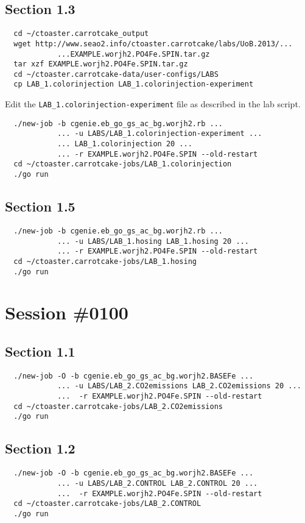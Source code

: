\documentclass[a4paper,10pt,article]{memoir}
\begin{document}
\subsection*{Section 1.3}

\begin{verbatim}
  cd ~/ctoaster.carrotcake_output
  wget http://www.seao2.info/ctoaster.carrotcake/labs/UoB.2013/...
            ...EXAMPLE.worjh2.PO4Fe.SPIN.tar.gz
  tar xzf EXAMPLE.worjh2.PO4Fe.SPIN.tar.gz
  cd ~/ctoaster.carrotcake-data/user-configs/LABS
  cp LAB_1.colorinjection LAB_1.colorinjection-experiment
\end{verbatim}

Edit the \texttt{LAB\_1.colorinjection-experiment} file as described
in the lab script.

\begin{verbatim}
  ./new-job -b cgenie.eb_go_gs_ac_bg.worjh2.rb ...
            ... -u LABS/LAB_1.colorinjection-experiment ...
            ... LAB_1.colorinjection 20 ...
            ... -r EXAMPLE.worjh2.PO4Fe.SPIN --old-restart
  cd ~/ctoaster.carrotcake-jobs/LAB_1.colorinjection
  ./go run
\end{verbatim}

\subsection*{Section 1.5}

\begin{verbatim}
  ./new-job -b cgenie.eb_go_gs_ac_bg.worjh2.rb ...
            ... -u LABS/LAB_1.hosing LAB_1.hosing 20 ...
            ... -r EXAMPLE.worjh2.PO4Fe.SPIN --old-restart
  cd ~/ctoaster.carrotcake-jobs/LAB_1.hosing
  ./go run
\end{verbatim}

\section{Session \#0100}

\subsection*{Section 1.1}

\begin{verbatim}
  ./new-job -O -b cgenie.eb_go_gs_ac_bg.worjh2.BASEFe ...
            ... -u LABS/LAB_2.CO2emissions LAB_2.CO2emissions 20 ...
            ...  -r EXAMPLE.worjh2.PO4Fe.SPIN --old-restart
  cd ~/ctoaster.carrotcake-jobs/LAB_2.CO2emissions
  ./go run
\end{verbatim}

\subsection*{Section 1.2}

\begin{verbatim}
  ./new-job -O -b cgenie.eb_go_gs_ac_bg.worjh2.BASEFe ...
            ... -u LABS/LAB_2.CONTROL LAB_2.CONTROL 20 ...
            ...  -r EXAMPLE.worjh2.PO4Fe.SPIN --old-restart
  cd ~/ctoaster.carrotcake-jobs/LAB_2.CONTROL
  ./go run
\end{verbatim}
\end{document}
